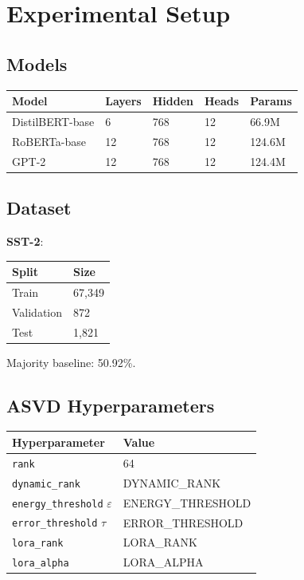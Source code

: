 
\section{Experimental Setup}

\subsection{Models}

\begin{table}[H]
\centering
\small
\begin{tabular}{lllll}
\toprule
\textbf{Model} & \textbf{Layers} & \textbf{Hidden} & \textbf{Heads} & \textbf{Params} \\
\midrule
DistilBERT-base & 6 & 768 & 12 & 66.9M \\
RoBERTa-base & 12 & 768 & 12 & 124.6M \\
GPT-2 & 12 & 768 & 12 & 124.4M \\
\bottomrule
\end{tabular}
\end{table}

\subsection{Dataset}

\textbf{SST-2}:

\begin{table}[H]
\centering
\small
\begin{tabular}{ll}
\toprule
\textbf{Split} & \textbf{Size} \\
\midrule
Train & 67,349 \\
Validation & 872 \\
Test & 1,821 \\
\bottomrule
\end{tabular}
\end{table}

Majority baseline: 50.92\%.

\subsection{ASVD Hyperparameters}

\begin{table}[H]
\centering
\small
\begin{tabular}{ll}
\toprule
\textbf{Hyperparameter} & \textbf{Value} \\
\midrule
\texttt{rank} & 64 \\
\texttt{dynamic\_rank} & {{DYNAMIC\_RANK}} \\
\texttt{energy\_threshold} $\varepsilon$ & {{ENERGY\_THRESHOLD}} \\
\texttt{error\_threshold} $\tau$ & {{ERROR\_THRESHOLD}} \\
\texttt{lora\_rank} & {{LORA\_RANK}} \\
\texttt{lora\_alpha} & {{LORA\_ALPHA}} \\
\bottomrule
\end{tabular}
\end{table}


